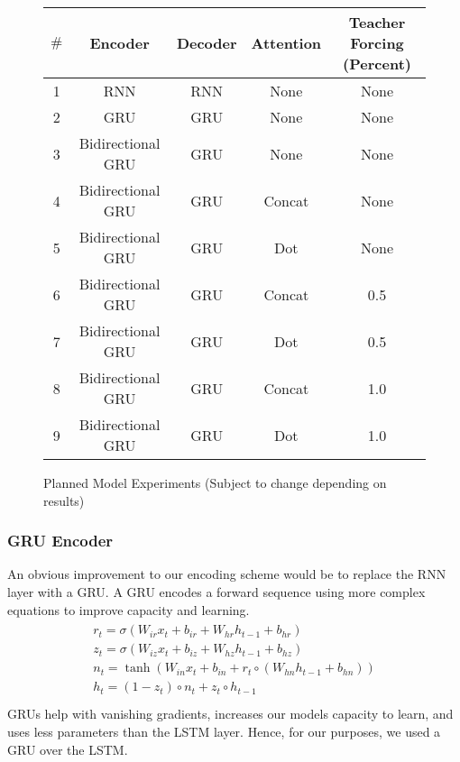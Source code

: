\documentclass[twoside,twocolumn]{article}
\begin{document}
\begin{figure*}[ht]
    \centering
    \begin{tabular}{ |c|c|c|c|c| }
        \hline
        $\#$
          & \textbf{Encoder}
          & \textbf{Decoder}
          & \textbf{Attention}
          & \textbf{Teacher Forcing (Percent)} \\
        \hline
        1 & RNN & RNN & None & None \\ \hline
        2 & GRU & GRU & None & None \\ \hline
        3 & Bidirectional GRU & GRU & None & None \\ \hline
        4 & Bidirectional GRU & GRU & Concat & None \\ \hline
        5 & Bidirectional GRU & GRU & Dot & None \\ \hline
        6 & Bidirectional GRU & GRU & Concat & 0.5 \\ \hline
        7 & Bidirectional GRU & GRU & Dot & 0.5 \\ \hline
        8 & Bidirectional GRU & GRU & Concat & 1.0 \\ \hline
        9 & Bidirectional GRU & GRU & Dot & 1.0 \\ \hline
    \end{tabular}

    \caption{Planned Model Experiments (Subject to change depending on results)}
    \label{fig:model-experiments}
\end{figure*}

\subsubsection{GRU Encoder}
An obvious improvement to our encoding scheme would be to replace the RNN layer
with a GRU. A GRU encodes a forward sequence using more complex equations to
improve capacity and learning.
\begin{equation}
  \label{eq:gru}
  \begin{split}\begin{array}{ll}
    r_t = \sigma(W_{ir} x_t + b_{ir} + W_{hr} h_{t-1} + b_{hr}) \\
    z_t = \sigma(W_{iz} x_t + b_{iz} + W_{hz} h_{t-1} + b_{hz}) \\
    n_t = \tanh(W_{in} x_t + b_{in} + r_t \circ (W_{hn} h_{t-1}+ b_{hn})) \\
    h_t = (1 - z_t) \circ n_t + z_t \circ h_{t-1} \\
  \end{array}\end{split}
\end{equation}
GRUs help with vanishing gradients, increases our models capacity to learn,
and uses less parameters than the LSTM layer. Hence, for our purposes, we
used a GRU over the LSTM.
\end{document}
